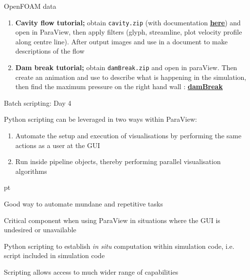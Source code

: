 \documentclass{beamer}
\begin{document}
\begin{frame}{OpenFOAM data}
    
    \begin{enumerate}
        \item {\bf Cavity flow tutorial;} obtain \texttt{cavity.zip} (with documentation \href{https://www.openfoam.com/documentation/tutorial-guide/}{\bf\underline{here}}) and open in ParaView, then apply filters (glyph, streamline, plot velocity profile along centre line). After output images and use in a document to make descriptions of the flow
        \item {\bf Dam break tutorial;} obtain \texttt{damBreak.zip} and open in paraView. Then create an animation and use to describe what is happening in the simulation, then find the maximum pressure on the right hand wall : \href{https://www.openfoam.com/documentation/tutorial-guide/tutorialse8.php#x14-680004.1}{\bf\underline{damBreak}}
    \end{enumerate}{}
    
\end{frame}{}

\begin{frame}{Batch scripting: Day 4}
    
    Python scripting can be leveraged in two ways within ParaView:
    \begin{enumerate}
        \item Automate the setup and execution of visualisations by performing the same actions as a user at the GUI
        \item Run inside pipeline objects, thereby performing parallel visualisation algorithms
    \end{enumerate}
    
     pt
    
    Good way to automate mundane and repetitive tasks
    
    \vskip 6pt
    
    Critical component when using ParaView in situations where the GUI is undesired or unavailable
    
    \vskip 6pt
    
    Python scripting to establish \emph{in situ} computation within simulation code, i.e. script included in simulation code
    
    \vskip 6pt
    
    Scripting allows access to much wider range of capabilities

\end{frame}{}
\end{document}
